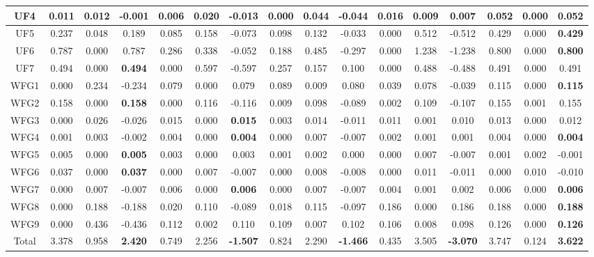 \begin{table}[b]
{\begin{tabular}{|c|c|c|c|c|c|c|c|c|c|c|c|c|c|c|c|}
UF4 & 0.011 & 0.012 & -0.001 & 0.006 & 0.020 & -0.013 & 0.000 & 0.044 & -0.044 & 0.016 & 0.009 & 0.007 & 0.052 & 0.000 & \textbf{0.052} \\ \hline
UF5 & 0.237 & 0.048 & 0.189 & 0.085 & 0.158 & -0.073 & 0.098 & 0.132 & -0.033 & 0.000 & 0.512 & -0.512 & 0.429 & 0.000 & \textbf{0.429} \\ \hline
UF6 & 0.787 & 0.000 & 0.787 & 0.286 & 0.338 & -0.052 & 0.188 & 0.485 & -0.297 & 0.000 & 1.238 & -1.238 & 0.800 & 0.000 & \textbf{0.800} \\ \hline
UF7 & 0.494 & 0.000 & \textbf{0.494} & 0.000 & 0.597 & -0.597 & 0.257 & 0.157 & 0.100 & 0.000 & 0.488 & -0.488 & 0.491 & 0.000 & 0.491 \\ \hline
WFG1 & 0.000 & 0.234 & -0.234 & 0.079 & 0.000 & 0.079 & 0.089 & 0.009 & 0.080 & 0.039 & 0.078 & -0.039 & 0.115 & 0.000 & \textbf{0.115} \\ \hline
WFG2 & 0.158 & 0.000 & \textbf{0.158} & 0.000 & 0.116 & -0.116 & 0.009 & 0.098 & -0.089 & 0.002 & 0.109 & -0.107 & 0.155 & 0.001 & 0.155 \\ \hline
WFG3 & 0.000 & 0.026 & -0.026 & 0.015 & 0.000 & \textbf{0.015} & 0.003 & 0.014 & -0.011 & 0.011 & 0.001 & 0.010 & 0.013 & 0.000 & 0.012 \\ \hline
WFG4 & 0.001 & 0.003 & -0.002 & 0.004 & 0.000 & \textbf{0.004} & 0.000 & 0.007 & -0.007 & 0.002 & 0.001 & 0.001 & 0.004 & 0.000 & \textbf{0.004} \\ \hline
WFG5 & 0.005 & 0.000 & \textbf{0.005} & 0.003 & 0.000 & 0.003 & 0.001 & 0.002 & 0.000 & 0.000 & 0.007 & -0.007 & 0.001 & 0.002 & -0.001 \\ \hline
WFG6 & 0.037 & 0.000 & \textbf{0.037} & 0.000 & 0.007 & -0.007 & 0.000 & 0.008 & -0.008 & 0.000 & 0.011 & -0.011 & 0.000 & 0.010 & -0.010 \\ \hline
WFG7 & 0.000 & 0.007 & -0.007 & 0.006 & 0.000 & \textbf{0.006} & 0.000 & 0.007 & -0.007 & 0.004 & 0.001 & 0.002 & 0.006 & 0.000 & \textbf{0.006} \\ \hline
WFG8 & 0.000 & 0.188 & -0.188 & 0.020 & 0.110 & -0.089 & 0.018 & 0.115 & -0.097 & 0.186 & 0.000 & 0.186 & 0.188 & 0.000 & \textbf{0.188} \\ \hline
WFG9 & 0.000 & 0.436 & -0.436 & 0.112 & 0.002 & 0.110 & 0.109 & 0.007 & 0.102 & 0.106 & 0.008 & 0.098 & 0.126 & 0.000 & \textbf{0.126} \\ \hline
Total & 3.378 & 0.958 & \textbf{2.420} & 0.749 & 2.256 & \textbf{-1.507} & 0.824 & 2.290 & \textbf{-1.466} & 0.435 & 3.505 & \textbf{-3.070} & 3.747 & 0.124 & \textbf{3.622} \\ \hline
\end{tabular}%
}
\end{table}


